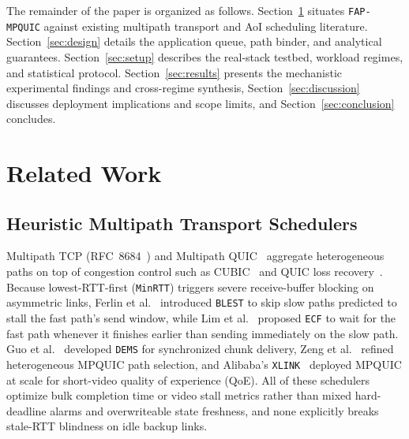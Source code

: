 \documentclass[preprint,12pt,number]{elsarticle}
\begin{document}
The remainder of the paper is organized as follows. Section~\ref{sec:related} situates \texttt{FAP-MPQUIC} against existing multipath transport and AoI scheduling literature. Section~\ref{sec:design} details the application queue, path binder, and analytical guarantees. Section~\ref{sec:setup} describes the real-stack testbed, workload regimes, and statistical protocol. Section~\ref{sec:results} presents the mechanistic experimental findings and cross-regime synthesis, Section~\ref{sec:discussion} discusses deployment implications and scope limits, and Section~\ref{sec:conclusion} concludes.

\section{Related Work}
\label{sec:related}

\subsection{Heuristic Multipath Transport Schedulers}
Multipath TCP (RFC~8684~\cite{rfc8684}) and Multipath QUIC~\cite{deconinck2017mpquic} aggregate heterogeneous paths on top of congestion control such as CUBIC~\cite{ha2008cubic} and QUIC loss recovery~\cite{rfc9000,rfc9002}. Because lowest-RTT-first (\texttt{MinRTT}) triggers severe receive-buffer blocking on asymmetric links, Ferlin et al.~\cite{ferlin2016blest} introduced \texttt{BLEST} to skip slow paths predicted to stall the fast path's send window, while Lim et al.~\cite{lim2017ecf} proposed \texttt{ECF} to wait for the fast path whenever it finishes earlier than sending immediately on the slow path. Guo et al.~\cite{guo2017dems} developed \texttt{DEMS} for synchronized chunk delivery, Zeng et al.~\cite{zeng2022optimizing} refined heterogeneous MPQUIC path selection, and Alibaba's \texttt{XLINK}~\cite{zheng2021xlink} deployed MPQUIC at scale for short-video quality of experience (QoE). All of these schedulers optimize bulk completion time or video stall metrics rather than mixed hard-deadline alarms and overwriteable state freshness, and none explicitly breaks stale-RTT blindness on idle backup links.
\end{document}

